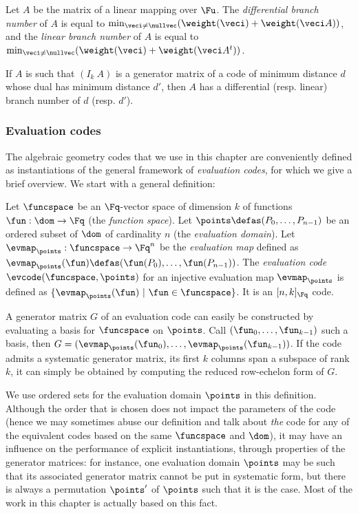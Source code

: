 \begin{defi}
Let $A$ be the matrix of a linear mapping over $\Fu$.
The \emph{differential branch number} of $A$
is equal to $\min_{\veci \neq \nullvec}(\weight(\veci) + \weight(\veci A))$,
and the \emph{linear branch number} of $A$ is equal to $\min_{\veci \neq \nullvec}(\weight(\veci) + \weight(\veci A^t))$.
\end{defi}

If $A$ is such that $(I_k~A)$ is a generator matrix of a code of minimum distance $d$ whose dual has minimum distance $d'$,
then $A$ has a differential (resp. linear) branch number of $d$ (resp. $d'$).

\subsubsection{Evaluation codes}

The algebraic geometry codes that we use in this chapter are conveniently defined as instantiations of the general framework of \emph{evaluation codes}, for which
we give a brief overview.
We start with a general definition:

\begin{defi}
Let $\funcspace$ be an $\Fq$-vector space of dimension $k$ of functions $\fun : \dom \rightarrow \Fq$ (the \emph{function space}). Let $\points \defas (P_0,\ldots, P_{n-1})$
be an ordered subset of $\dom$ of cardinality $n$ (the \emph{evaluation domain}). Let $\evmap_\points : \funcspace \rightarrow \Fq^n$ be the \emph{evaluation map}
defined as $\evmap_\points(\fun) \defas (\fun(P_0),\ldots,\fun(P_{n-1}))$.
The \emph{evaluation code} $\evcode(\funcspace,\points)$ for an injective evaluation map $\evmap_\points$ is defined as $\{\evmap_\points(\fun)~|~\fun \in \funcspace\}$.
It is an $[n,k]_{\Fq}$ code.
\end{defi}

A generator matrix $G$ of an evaluation code can easily be constructed by evaluating a basis for $\funcspace$ on $\points$. Call $(\fun_0,\ldots,\fun_{k-1})$
such a basis, then $G = (\evmap_\points(\fun_0),\ldots,\evmap_\points(\fun_{k-1}))$.
If the code admits a systematic generator matrix, \ie its first $k$ columns span a subspace of rank $k$, it can simply be obtained by computing the reduced row-echelon form of $G$.

We use ordered sets for the evaluation domain $\points$ in this definition. Although the order that is chosen does not impact the parameters of the code (hence we
may sometimes abuse our definition and talk about \emph{the} code for any of the equivalent codes based on the same $\funcspace$ and $\dom$), it may have
an influence on the performance of explicit instantiations, through \eg properties of the generator matrices: for instance, one
evaluation domain $\points$ may be such that its associated generator matrix cannot be put in systematic form, but there is always
a permutation $\points'$ of $\points$ such that it is the case. Most of the work
in this chapter is actually based on this fact.


